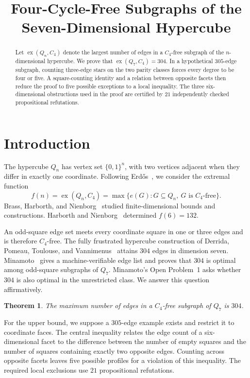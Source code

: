\documentclass[11pt,reqno]{amsart}
\title[Four-cycle-free subgraphs of the seven-cube]
  {Four-Cycle-Free Subgraphs of the Seven-Dimensional Hypercube}
\numberwithin{equation}{section}
\newtheorem{theorem}{Theorem}[section]
\newcommand{\ex}{\operatorname{ex}}
\begin{document}
\begin{abstract}
Let \(\ex(Q_n,C_4)\) denote the largest number of edges in a
\(C_4\)-free subgraph of the \(n\)-dimensional hypercube. We prove that
\(\ex(Q_7,C_4)=304\). In a hypothetical \(305\)-edge subgraph, counting
three-edge stars on the two parity classes forces every degree to be
four or five. A square-counting identity and a relation between opposite
facets then reduce the proof to five possible exceptions to a local
inequality. The three six-dimensional obstructions used in the proof
are certified by \(21\) independently checked propositional refutations.
\end{abstract}

\maketitle

\section{Introduction}\label{sec:intro}

The hypercube \(Q_n\) has vertex set \(\{0,1\}^n\), with two vertices
adjacent when they differ in exactly one coordinate. Following
Erd\H{o}s~\cite{erdos}, we consider the extremal function
\[
  f(n)=\ex(Q_n,C_4)
       =\max\{e(G):G\subseteq Q_n,\ G\text{ is }C_4\text{-free}\}.
\]
Brass, Harborth, and Nienborg~\cite{bhn} studied finite-dimensional
bounds and constructions. Harborth and Nienborg~\cite{hn} determined
\(f(6)=132\).

An odd-square edge set meets every coordinate square in one or three
edges and is therefore \(C_4\)-free. The fully frustrated hypercube
construction of Derrida, Pomeau, Toulouse, and Vannimenus~\cite{dptv}
attains \(304\) edges in dimension seven. Minamoto~\cite{minamoto} gives
a machine-verifiable edge list and proves that \(304\) is optimal
among odd-square subgraphs of \(Q_7\). Minamoto's Open Problem~1 asks
whether \(304\) is also optimal in the unrestricted class. We answer
this question affirmatively.

\begin{theorem}\label{thm:q7}
The maximum number of edges in a \(C_4\)-free subgraph of \(Q_7\) is
\(304\).
\end{theorem}

For the upper bound, we suppose a \(305\)-edge example exists and
restrict it to coordinate faces. The central inequality relates the
edge count of a six-dimensional facet to the difference between the
number of empty squares and the number of squares containing exactly
two opposite edges. Counting across opposite facets leaves five
possible profiles for a violation of this inequality. The required
local exclusions use \(21\) propositional refutations.
\end{document}
